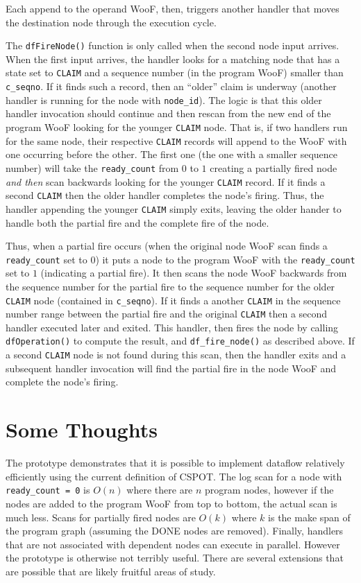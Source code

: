 \documentclass[10pt]{article}
\begin{document}
Each append to the operand WooF, then, triggers another handler that moves the
destination node through the execution cycle.

The \verb+dfFireNode()+ function is only called when the second node input
arrives.  When the first input arrives, the handler looks for a matching node
that has a state set to \verb+CLAIM+ and a sequence number (in the program
WooF) smaller than \verb+c_seqno+.  If it finds such a record, then an
``older'' claim is underway (another handler is running for the node with
\verb+node_id+).  The logic is that this older handler invocation should
continue and then rescan from the new end of the program WooF looking for the
younger \verb+CLAIM+ node.  That is, if two handlers run for the same node,
their respective \verb+CLAIM+ records will append to the WooF with one
occurring before the other.  The first one (the one with a smaller sequence
number) will take the \verb+ready_count+ from $0$ to $1$ creating a partially
fired node \textit{and then} scan backwards looking for the younger
\verb+CLAIM+ record.  If it finds a second \verb+CLAIM+ then the older handler
completes the node's firing.  Thus, the handler appending the younger
\verb+CLAIM+ simply exits, leaving the older hander to handle both the partial
fire and the complete fire of the node.

Thus, when a partial fire occurs (when the original node WooF scan finds a
\verb+ready_count+ set to $0$) it puts a node to the program WooF with the
\verb+ready_count+ set to $1$ (indicating a partial fire).  It then scans
the node WooF backwards from the sequence number for the partial fire to the
sequence number for the older \verb+CLAIM+ node (contained in \verb+c_seqno+).
If it finds a another \verb+CLAIM+ in the sequence number range between the
partial fire and the original \verb+CLAIM+ then a second handler executed later
and exited.  This handler, then fires the node by calling \verb+dfOperation()+
to compute the result, and \verb+df_fire_node()+ as described above.  If a second
\verb+CLAIM+ node is not found during this scan, then the handler exits and a
subsequent handler invocation will find the partial fire in the node WooF and
complete the node's firing.

\section{Some Thoughts}

The prototype demonstrates that it is possible to implement dataflow
relatively efficiently using the current definition of CSPOT.  The log scan
for a node with \verb+ready_count = 0+ is $O(n)$ where there are $n$ program
nodes, however if the nodes are added to the program WooF from top to bottom,
the actual scan is much less.  Scans for partially fired nodes are $O(k)$
where $k$ is the make span of the program graph (assuming the DONE nodes are
removed).  Finally, handlers that are
not associated with dependent nodes can execute in parallel.
However the prototype is otherwise not terribly useful.  There are
several extensions that are possible that are likely fruitful areas of study.
\end{document}
